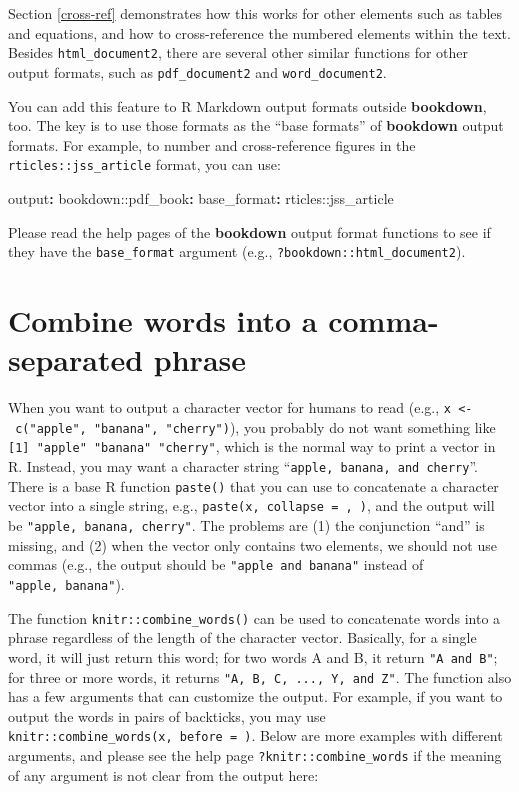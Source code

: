 \documentclass[
  11pt,
]{krantz}
\newenvironment{Shaded}{\begin{snugshade}}{\end{snugshade}}
\newcommand{\AttributeTok}[1]{\textcolor[rgb]{0.61,0.61,0.61}{#1}}
\newcommand{\FunctionTok}[1]{\textcolor[rgb]{0,0,0}{#1}}
\newcommand{\KeywordTok}[1]{\textcolor[rgb]{0.27,0.27,0.27}{\textbf{#1}}}
\begin{document}
Section \ref{cross-ref} demonstrates how this works for other elements such as tables and equations, and how to cross-reference the numbered elements within the text. Besides \texttt{html\_document2}, there are several other similar functions for other output formats, such as \texttt{pdf\_document2} and \texttt{word\_document2}.

You can add this feature to R Markdown output formats outside \textbf{bookdown}, too. The key is to use those formats as the ``base formats'' of \textbf{bookdown} output formats. For example, to number and cross-reference figures in the \texttt{rticles::jss\_article} format, you can use:

\begin{Shaded}
\begin{Highlighting}[]
\FunctionTok{output}\KeywordTok{:}
\AttributeTok{  bookdown:}\FunctionTok{:pdf_book}\KeywordTok{:}
\AttributeTok{    }\FunctionTok{base_format}\KeywordTok{:}\AttributeTok{ rticles::jss_article}
\end{Highlighting}
\end{Shaded}

Please read the help pages of the \textbf{bookdown} output format functions to see if they have the \texttt{base\_format} argument (e.g., \texttt{?bookdown::html\_document2}).

\hypertarget{combine-words}{%
\section{Combine words into a comma-separated phrase}\label{combine-words}}

When you want to output a character vector for humans to read (e.g., \texttt{x\ \textless{}-\ c("apple",\ "banana",\ "cherry")}), you probably do not want something like \texttt{{[}1{]}\ "apple"\ "banana"\ "cherry"}, which is the normal way to print a vector in R. Instead, you may want a character string ``\texttt{apple,\ banana,\ and\ cherry}''. There is a base R function \texttt{paste()} that you can use to concatenate a character vector into a single string, e.g., \texttt{paste(x,\ collapse\ =\ \textquotesingle{},\ \textquotesingle{})}, and the output will be \texttt{"apple,\ banana,\ cherry"}. The problems are (1) the conjunction ``and'' is missing, and (2) when the vector only contains two elements, we should not use commas (e.g., the output should be \texttt{"apple\ and\ banana"} instead of \texttt{"apple,\ banana"}).

The function \texttt{knitr::combine\_words()} can be used to concatenate words into a phrase regardless of the length of the character vector. Basically, for a single word, it will just return this word; for two words A and B, it return \texttt{"A\ and\ B"}; for three or more words, it returns \texttt{"A,\ B,\ C,\ ...,\ Y,\ and\ Z"}. The function also has a few arguments that can customize the output. For example, if you want to output the words in pairs of backticks, you may use \texttt{knitr::combine\_words(x,\ before\ =\ \textquotesingle{}\textasciigrave{}\textquotesingle{})}. Below are more examples with different arguments, and please see the help page \texttt{?knitr::combine\_words} if the meaning of any argument is not clear from the output here:
\end{document}
